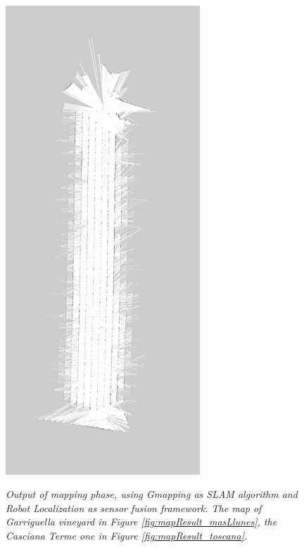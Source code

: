 \begin{figure}
\begin{minipage}[c]{.5\textwidth}
{		\includegraphics[width=0.65\textwidth]{Images/experimental_data/toscana_map.png}
		\label{fig:mapResult_toscana}}
	\end{minipage}
	\caption{\textit{Output of mapping phase, using Gmapping as \ac{SLAM} algorithm and Robot Localization as sensor fusion framework. The map of Garriguella vineyard in Figure \ref{fig:mapResult_masLlunes}, the Casciana Terme one in Figure \ref{fig:mapResult_toscana}.}}
	\label{fig:mappingResults}
\end{figure}



